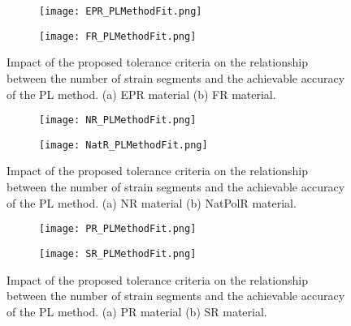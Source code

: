 \newpage

\begin{figure}[H]
	\centering
	\begin{subfigure}[b]{0.9\textwidth}
		\centering
		\texttt{[image: EPR\_PLMethodFit.png]}
		\caption{}
		\label{fig:SegmentsEPR}
	\end{subfigure}
	\begin{subfigure}[b]{0.9\textwidth}
		\centering
		\texttt{[image: FR\_PLMethodFit.png]}
		\caption{}
		\label{fig:SegmentsFR}
	\end{subfigure}
	\caption{Impact of the proposed tolerance criteria on the relationship between the number of strain segments and the achievable accuracy of the PL method. (a) EPR material (b) FR material.}
	\label{fig:SegmentsEPR_FR}
\end{figure}

\begin{figure}[H]
	\centering
	\begin{subfigure}[b]{0.9\textwidth}
		\centering
		\texttt{[image: NR\_PLMethodFit.png]}
		\caption{}
		\label{fig:SegmentsNR}
	\end{subfigure}
	\begin{subfigure}[b]{0.9\textwidth}
		\centering
		\texttt{[image: NatR\_PLMethodFit.png]}
		\caption{}
		\label{fig:SegmentsNatR}
	\end{subfigure}
	\caption{Impact of the proposed tolerance criteria on the relationship between the number of strain segments and the achievable accuracy of the PL method. (a) NR material (b) NatPolR material.}
	\label{fig:SegmentsNR_NatR}
\end{figure}

\begin{figure}[H]
	\centering
	\begin{subfigure}[b]{0.9\textwidth}
		\centering
		\texttt{[image: PR\_PLMethodFit.png]}
		\caption{}
		\label{fig:SegmentsPR}
	\end{subfigure}
	\begin{subfigure}[b]{0.9\textwidth}
		\centering
		\texttt{[image: SR\_PLMethodFit.png]}
		\caption{}
		\label{fig:SegmentsSR}
	\end{subfigure}
	\caption{Impact of the proposed tolerance criteria on the relationship between the number of strain segments and the achievable accuracy of the PL method. (a) PR material (b) SR material.}
	\label{fig:SegmentsPR_SR}
\end{figure}

